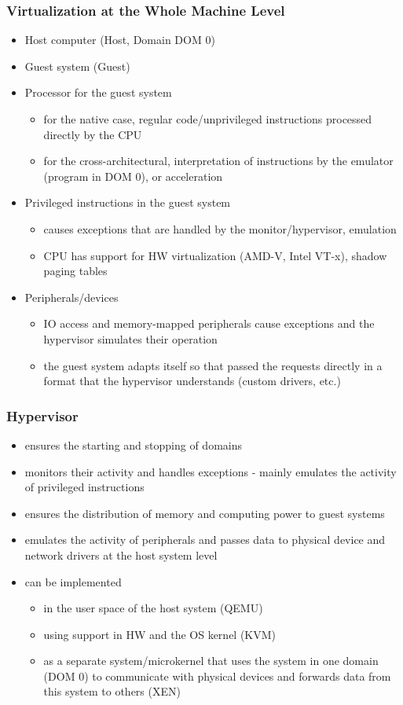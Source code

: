 \documentclass{beamer}
\begin{document}
\begin{frame}
\frametitle{Virtualization at the Whole Machine Level}

\begin{itemize}
 \item Host computer (Host, Domain DOM 0)
 \item Guest system (Guest)
 \item Processor for the guest system
 \begin{itemize}
  \item for the native case, regular code/unprivileged instructions processed directly by the CPU
  \item for the cross-architectural, interpretation of instructions by the emulator (program in DOM 0), or acceleration
 \end{itemize}
 \item Privileged instructions in the guest system
 \begin{itemize}
  \item causes exceptions that are handled by the monitor/hypervisor, emulation
  \item CPU has support for HW virtualization (AMD-V, Intel VT-x), shadow paging tables
 \end{itemize}
 \item Peripherals/devices
 \begin{itemize}
  \item IO access and memory-mapped peripherals cause exceptions and the hypervisor simulates their operation
  \item the guest system adapts itself so that passed the requests directly in a format that the hypervisor understands (custom drivers, etc.)
 \end{itemize}
\end{itemize}
\end{frame}

\begin{frame}
\frametitle{Hypervisor}

\begin{itemize}
 \item ensures the starting and stopping of domains
 \item monitors their activity and handles exceptions - mainly emulates the activity of privileged instructions
 \item ensures the distribution of memory and computing power to guest systems
 \item emulates the activity of peripherals and passes data to physical device and network drivers at the host system level
 \item can be implemented
 \begin{itemize}
  \item in the user space of the host system (QEMU)
  \item using support in HW and the OS kernel (KVM)
  \item as a separate system/microkernel that uses the system in one domain (DOM 0) to communicate with physical devices and forwards data from this system to others (XEN) 
 \end{itemize}
\end{itemize}
\end{frame}
\end{document}

